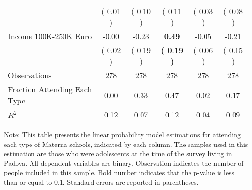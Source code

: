 \begin{table}[H]
{\begin{tabular}{lccccc}
\quad  & (     0.01 ) & (     0.10 )  & (     0.11 )  & (     0.03 ) & (     0.08 ) \\
\quad Income 100K-250K Euro &     -0.00 &     -0.23 & \textbf{     0.49} &     -0.05 &     -0.21 \\
\quad  & (     0.02 ) & (     0.19 )  & \textbf{(     0.19 )}  & (     0.06 ) & (     0.15 ) \\
\midrule
Observations & 278 & 278 & 278 & 278 & 278 \\
Fraction Attending Each Type &      0.00 &      0.33 &      0.47 &      0.02 &      0.17 \\
\midrule
$ R^2$ &      0.12 &      0.07 &      0.12 &      0.04 &      0.09 \\
\bottomrule
\end{tabular}}
\end{table}
\begin{scriptsize}
\noindent\underline{Note:} This table presents the linear probability model estimations for attending each type of Materna schools, indicated by each column. The samples used in this estimation are those who were adolescents at the time of the survey living in Padova. All dependent variables are binary. Observation indicates the number of people included in this sample. Bold number indicates that the p-value is less than or equal to 0.1. Standard errors are reported in parentheses.
\end{scriptsize}
